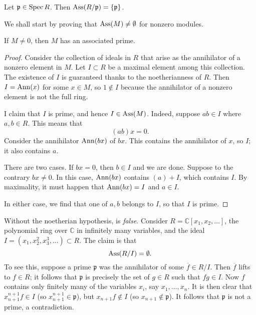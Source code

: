 \begin{exercise} 
Let $\mathfrak{p} \in \operatorname{Spec} R$. Then $\operatorname{Ass}(R/\mathfrak{p}) =
\left\{\mathfrak{p}\right\}$.
\end{exercise} 

We shall start by proving that $\operatorname{Ass}(M) \neq \emptyset$ for nonzero modules. 
\begin{proposition} \label{assmnonempty} 
If $M \neq 0$, then $M$ has an associated prime.
\end{proposition} 
\begin{proof}  Consider the collection of ideals in $R$ that arise as the
annihilator of a nonzero element in $M$. 
Let $I \subset R$ be a maximal element among this collection.  The existence of $I$ is guaranteed thanks to the noetherianness of
$R$.
Then $I = \operatorname{Ann}(x)$ for some $x \in M$, so  $1 \notin I$ because the annihilator of a nonzero element is not the full
ring.

I claim that
$I$ is prime,  and hence $I \in \operatorname{Ass}(M)$.  
Indeed, suppose $ab \in I$ where $a,b \in R$. This means that
\[ (ab)x = 0.  \]
Consider the annihilator $\operatorname{Ann}(bx)$ of $bx$. This contains the annihilator of $x$, so $I$;
it also contains $a$.

There are two cases. If $bx = 0$, then $ b \in I$ and we are done. Suppose to
the contrary $bx \neq 0$. In this case, $\operatorname{Ann}(bx)$ contains $(a) + I$, which
 contains $I$. By maximality, it must happen that $\operatorname{Ann}(bx) = I$ and $ a \in
 I$. 

 In either case, we find that one of $a,b $ belongs to $I$, so that $I$ is
 prime. 

\end{proof} 

\begin{example} 
Without the noetherian hypothesis,  is
\emph{false}. Consider $R = \mathbb{C}[x_1, x_2, \dots]$, the polynomial ring
over $\mathbb{C}$ in infinitely many variables, and the ideal $I = (x_1,
x_2^2, x_3^3, \dots) \subset R$.
The claim is that 
\[ \operatorname{Ass}(R/I ) = \emptyset.  \]
To see this, suppose a prime $\mathfrak{p}$ was the annihilator of some
$\overline{f}\in R/I$.  Then $\overline{f}$ lifts to $f \in R$; it follows
that $\mathfrak{p}$ is precisely the set of $g \in R$ such that $fg \in I$.
Now $f$ contains only finitely many of the variables $x_i$, say $x_1, \dots,
x_n$. It is then clear that $x_{n+1}^{n+1} f \in I$  (so $x_{n+1}^{n+1} \in
\mathfrak{p}$), but $x_{n+1} f \notin I$ (so $x_{n+1} \notin \mathfrak{p}$).
It follows that $\mathfrak{p}$ is not a prime, a contradiction.
\end{example} 

